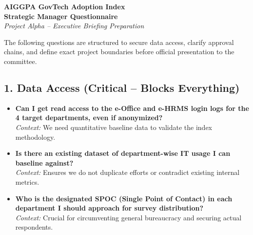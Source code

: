 \documentclass[12pt,a4paper]{article}
\begin{document}
\begin{center}
    {\Large \textbf{\color{aiggpanavy} AIGGPA GovTech Adoption Index}}\\[0.5em]
    {\large \textbf{Strategic Manager Questionnaire}}\\[0.2em]
    \textit{Project Alpha -- Executive Briefing Preparation}
\end{center}

\vspace{1em}

\begin{tcolorbox}[colback=gray!5,colframe=gray!20,title=\textbf{Objective}]
The following questions are structured to secure data access, clarify approval chains, and define exact project boundaries before official presentation to the committee.
\end{tcolorbox}

\vspace{1em}

\subsection*{{\color{redalert} \textbf{1. Data Access (Critical -- Blocks Everything)}}}
\begin{itemize}[leftmargin=*, label={\color{redalert} $\blacksquare$}]
    \item \textbf{Can I get read access to the e-Office and e-HRMS login logs for the 4 target departments, even if anonymized?}
    \vspace{0.2em} \\
    \textit{Context:} We need quantitative baseline data to validate the index methodology.
    
    \item \textbf{Is there an existing dataset of department-wise IT usage I can baseline against?}
    \vspace{0.2em} \\
    \textit{Context:} Ensures we do not duplicate efforts or contradict existing internal metrics.
    
    \item \textbf{Who is the designated SPOC (Single Point of Contact) in each department I should approach for survey distribution?}
    \vspace{0.2em} \\
    \textit{Context:} Crucial for circumventing general bureaucracy and securing actual respondents.
\end{itemize}
\end{document}

